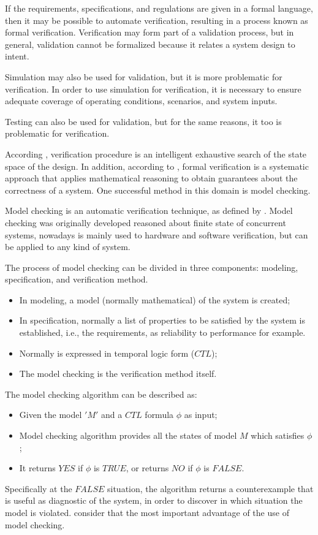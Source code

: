 \documentclass[journal]{IEEEtran}
\begin{document}
If the requirements, specifications, and regulations are given in a formal language, then it may be possible to automate verification, resulting in a process known as formal verification. Verification may form part of a validation process, but in general, validation cannot be formalized because it relates a system design to intent.  

Simulation may also be used for validation, but it is more problematic for verification. In order to use simulation for verification, it is necessary to ensure adequate coverage of operating conditions, scenarios, and system inputs. 

Testing can also be used for validation, but for the same reasons, it too is problematic for verification.
 
According \cite{Clarke2008}, verification procedure is an intelligent exhaustive search of the state space of the design. In addition, according to \cite{Forejt2011}, formal verification is a systematic approach that applies mathematical reasoning to obtain guarantees about the correctness of a system. One successful method in this domain is model checking.
  
Model checking is an automatic verification technique, as defined by \cite{Clarke2008}. Model checking was originally developed reasoned about finite state of concurrent systems, nowadays is mainly used to hardware and software verification, but can be applied to any kind of system. 

The process of model checking can be divided in three components: modeling, specification, and verification method. 

\begin{itemize}
\item In modeling, a model (normally mathematical) of the system is created; 
\item In specification, normally a list of properties to be satisfied by the system is established, i.e., the requirements, as reliability to performance for example. \item Normally is expressed in temporal logic form ($CTL$); 
\item The model checking is the verification method itself. 
\end{itemize}

The model checking algorithm can be described as:  

\begin{itemize}
\item Given the model $ 'M' $ and a $CTL$ formula $ \phi $ as input;  
\item Model checking algorithm provides all the states of model $ M $ which satisfies $ \phi $;  
\item It returns $YES$ if $ \phi $ is $TRUE$, or returns $NO$ if $ \phi $ is $FALSE$.  

\end{itemize}
Specifically at the $FALSE$ situation, the algorithm returns a counterexample that is useful as diagnostic of the system, in order to discover in which situation the model is violated. \cite{Clarke2008} consider that the most important advantage of the use of model checking.  
 
\end{document}

